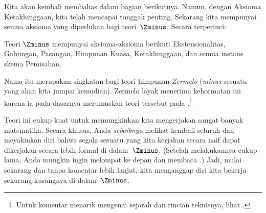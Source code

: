 \documentclass[../../../include/open-logic-section]{subfiles}
\begin{document}

Kita akan kembali membahas \stagesinf{} dalam bagian berikutnya. Namun,
dengan Aksioma Ketakhinggaan, kita telah mencapai tonggak penting. Sekarang
kita mempunyai semua aksioma yang diperlukan bagi teori~$\Zminus$. Secara
terperinci:

\begin{defn}
Teori $\Zminus$ mempunyai aksioma-aksioma berikut: Ekstensionalitas, Gabungan,
Pasangan, Himpunan Kuasa, Ketakhinggaan, dan semua instans skema Pemisahan.
\end{defn}

Nama itu merupakan singkatan bagi teori himpunan \emph{Zermelo}
(\emph{minus} sesuatu yang akan kita jumpai kemudian). Zermelo layak menerima
kehormatan ini karena ia pada dasarnya merumuskan teori tersebut pada
\citeyear{Zermelo1908Untersuchungen}.\footnote{Untuk komentar menarik mengenai
sejarah dan rincian teknisnya, lihat \citet[Lampiran
A]{Potter2004}.}

Teori ini cukup kuat untuk memungkinkan kita mengerjakan sangat banyak
matematika. Secara khusus, Anda \emph{sebaiknya} melihat kembali seluruh
 dan meyakinkan diri bahwa segala sesuatu yang kita
kerjakan secara naif dapat dikerjakan secara lebih formal di dalam~$\Zminus$.
(Setelah melakukannya cukup lama, Anda mungkin ingin melompat ke depan dan
membaca .) Jadi, mulai sekarang dan tanpa
komentar lebih lanjut, kita menganggap diri kita bekerja sekurang-kurangnya
di dalam~$\Zminus$.
\end{document}

